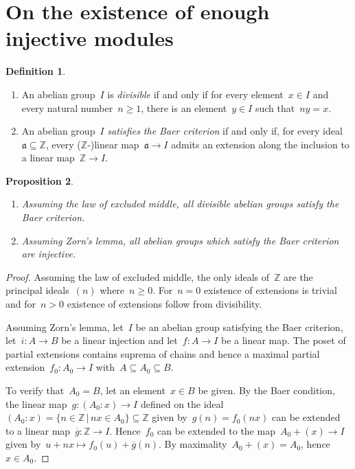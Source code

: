 \documentclass[oneside]{amsart}
\theoremstyle{definition}
\newtheorem{defn}{Definition}[section]
\theoremstyle{plain}
\newtheorem{prop}[defn]{Proposition}
\theoremstyle{remark}
\newcommand{\aaa}{\mathfrak{a}}
\newcommand{\ZZ}{\mathbb{Z}}
\renewcommand{\_}{\mathpunct{.}\,}
\begin{document}
\printbibliography
\enlargethispage{1em}

\appendix


\section{On the existence of enough injective modules}
\label{sect:enough-injective-modules}

\begin{defn}\begin{enumerate}
\item An abelian group~$I$ is \emph{divisible} if and only if for every
element~$x \in I$ and every natural number~$n \geq 1$, there is an element~$y \in I$
such that~$ny = x$.
\item An abelian group~$I$ \emph{satisfies the Baer criterion} if and only if,
for every ideal~$\aaa \subseteq \ZZ$, every ($\ZZ$-)linear map~$\aaa \to I$
admits an extension along the inclusion to a linear map~$\ZZ \to I$.
\end{enumerate}
\end{defn}

\begin{prop}
\label{prop:embed1}
\begin{enumerate}
\item Assuming the law of excluded middle, all divisible abelian groups satisfy
the Baer criterion.
\item Assuming Zorn's lemma, all abelian groups which satisfy the Baer criterion
are injective.
\end{enumerate}
\end{prop}

\begin{proof}Assuming the law of excluded middle, the only ideals of~$\ZZ$ are
the principal ideals~$(n)$ where~$n \geq 0$. For~$n = 0$ existence of
extensions is trivial and for~$n > 0$ existence of extensions follow from
divisibility.

Assuming Zorn's lemma, let~$I$ be an abelian group satisfying the Baer
criterion, let~$i : A \to B$ be a linear injection and let~$f : A \to I$ be a
linear map. The poset of partial extensions contains suprema of chains and
hence a maximal partial extension~$f_0 : A_0 \to I$ with~$A \subseteq A_0
\subseteq B$.

To verify that~$A_0 = B$, let an element~$x \in B$ be given.
By the Baer condition, the linear map~$g : (A_0 : x) \to I$ defined on the
ideal~$(A_0 : x) = \{ n \in \ZZ \,|\, nx \in A_0 \} \subseteq \ZZ$ given by~$g(n) =
f_0(nx)$ can be extended to a linear map~$\overline{g} : \ZZ \to I$.
Hence~$f_0$ can be extended to the map~$A_0 + (x) \to I$ given by~$u + nx
\mapsto f_0(u) + \overline{g}(n)$. By maximality~$A_0 + (x) = A_0$, hence~$x \in A_0$.
\end{proof}
\end{document}
